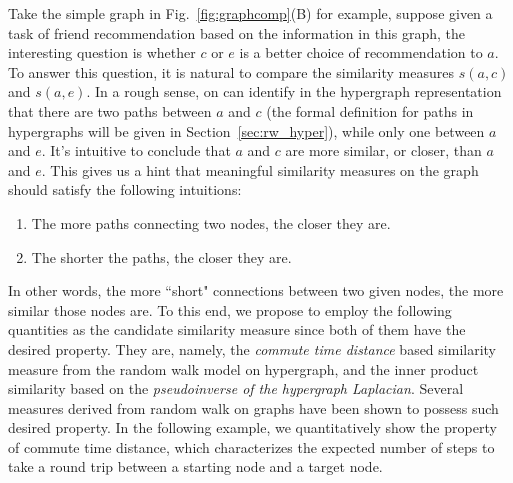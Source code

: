 Take the simple graph in Fig.~\ref{fig:graphcomp}(B) for example, suppose given a task of friend recommendation based on the information in this graph, the interesting question is whether $c$ or $e$ is a better choice of recommendation to $a$. To answer this question, it is natural to compare the similarity measures $s(a, c)$ and $s(a, e)$. In a rough sense, on can identify in the hypergraph representation that there are two paths between $a$ and $c$ (the formal definition for paths in hypergraphs will be given in Section~\ref{sec:rw_hyper}), while only one between $a$ and $e$. It's intuitive to conclude that $a$ and $c$ are more similar, or closer, than $a$ and $e$. This gives us a hint that meaningful similarity measures on the graph should satisfy the following intuitions:
\begin{enumerate}
\item The more paths connecting two nodes, the closer they are.
\item The shorter the paths, the closer they are.
\end{enumerate}
In other words, the more ``short" connections between two given nodes, the more similar those nodes are. 
To this end, we propose to employ the following quantities as the candidate similarity measure since both of them have the desired property. They are, namely, the \emph{commute time distance} based similarity measure from the random walk model on hypergraph, and the inner product similarity based on the \emph{pseudoinverse of the hypergraph Laplacian}. 
Several measures derived from random walk on graphs have been shown to possess such desired property. In the following example, we quantitatively show the property of commute time distance, which characterizes the expected number of steps to take a round trip between a starting node and a target node.

